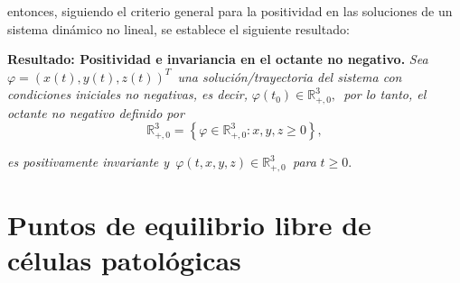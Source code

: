 \documentclass[letterpaper,11pt]{article}
\begin{document}
entonces, siguiendo el criterio general para la positividad en las
soluciones de un sistema din\'{a}mico no lineal, se establece el siguiente
resultado:

\textbf{Resultado: Positividad e invariancia en el octante no negativo. }%
\emph{Sea}\textit{\ }$\varphi =\left( x\left( t\right) ,y\left( t\right)
,z\left( t\right) \right) ^{T}$\textit{\ \emph{una soluci\'{o}n/trayectoria
del sistema con condiciones iniciales no negativas, es decir,} }$\varphi
\left( t_{0}\right) \in 
\mathbb{R}
_{+,0}^{3},$\textit{\ }\emph{por lo tanto, el octante no negativo definido
por}%
\begin{equation*}
\mathbb{R}
_{+,0}^{3}=\left\{ \varphi \in 
\mathbb{R}
_{+,0}^{3}:x,y,z\geq 0\right\} ,
\end{equation*}

\emph{es positivamente invariante y}\textit{\ }$\varphi \left(
t,x,y,z\right) \in 
\mathbb{R}
_{+,0}^{3}$\textit{\ \emph{para} }$t\geq 0.$

\section{Puntos de equilibrio libre de c\'{e}lulas patol\'{o}gicas}
\end{document}
